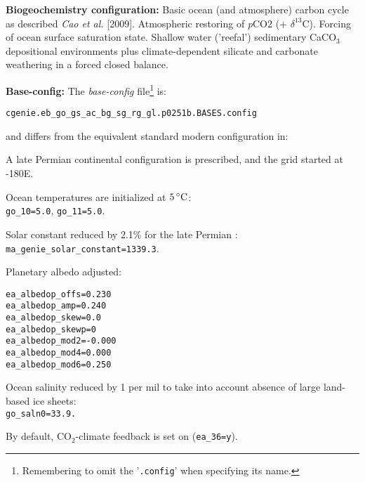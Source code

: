 \documentclass[10pt,twoside]{article}
\begin{document}
\noindent \textbf{Biogeochemistry configuration:} Basic ocean (and atmosphere) carbon cycle as described \textit{Cao et al.} [2009]. Atmospheric restoring of \textit{p}CO2 (+ $\delta^{13}$C). Forcing of ocean surface saturation state. Shallow water ('reefal') sedimentary CaCO$_{3}$ depositional environments plus climate-dependent silicate and carbonate weathering in a forced closed balance.

\noindent \textbf{Base-config:} The \textit{base-config} file\footnote{Remembering to omit the '\texttt{.config}' when specifying its name.} is:
\vspace{-10pt}\begin{verbatim}cgenie.eb_go_gs_ac_bg_sg_rg_gl.p0251b.BASES.config\end{verbatim}\vspace{-10pt}
and differs from the equivalent standard modern configuration in:
        \begin{compactitem}
        \item A late Permian continental configuration is prescribed, and the grid started at -180E.
                \item Ocean temperatures are initialized at $5\,^{\circ}{\rm C}$:
                \\ \texttt{go\_10=5.0}, \texttt{go\_11=5.0}.
                \item Solar constant reduced by 2.1\% for the late Permian      :
                \\ \texttt{ma\_genie\_solar\_constant=1339.3}.
                \item Planetary albedo adjusted:
                \vspace{-5pt}\begin{verbatim}
ea_albedop_offs=0.230
ea_albedop_amp=0.240
ea_albedop_skew=0.0
ea_albedop_skewp=0
ea_albedop_mod2=-0.000
ea_albedop_mod4=0.000
ea_albedop_mod6=0.250
\end{verbatim}\vspace{-5pt}
\item Ocean salinity reduced by 1 per mil to take into account absence of large land-based ice sheets:
\\ \texttt{go\_saln0=33.9.}
\item By default, CO$_{2}$-climate feedback is set on (\texttt{ea\_36=y}).
        \end{compactitem}
\end{document}
